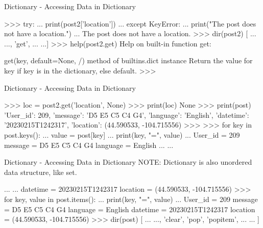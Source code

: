 \documentclass{beamer}
\begin{document}
\begin{frame}[fragile]{Dictionary - Accessing Data in Dictionary}
\begin{pythoncode}
>>> try:
...     print(post2['location'])
... except KeyError:
...     print("The post does not have a location.")
...
The post does not have a location.
>>> dir(post2)
[ ... ..., 'get', ... ...]
>>> help(post2.get)
Help on built-in function get:

get(key, default=None, /) method of builtins.dict instance
    Return the value for key if key is in the dictionary, else default.
>>> 
\end{pythoncode}
\end{frame}

\begin{frame}[fragile]{Dictionary - Accessing Data in Dictionary}
\begin{pythoncode}
>>> loc = post2.get('location', None)
>>> print(loc)
None
>>> print(post)
{'User_id': 209, 'message': 'D5 E5 C5 C4 G4', 'language': 'English', 
 'datetime': '20230215T1242317', 'location': (44.590533, -104.715556)}
>>>
>>> for key in post.keys():
...     value = post[key]
...     print(key, "=", value)
...
User_id = 209
message = D5 E5 C5 C4 G4
language = English
... ...
\end{pythoncode}
\end{frame}

\begin{frame}[fragile]{Dictionary - Accessing Data in Dictionary}
NOTE: Dictionary is also unordered data structure, like set.
\begin{pythoncode}
... ...
datetime = 20230215T1242317
location = (44.590533, -104.715556)
>>> for key, value in post.items():
...     print(key, "=", value)
...
User_id = 209
message = D5 E5 C5 C4 G4
language = English
datetime = 20230215T1242317
location = (44.590533, -104.715556)
>>> dir(post)
[ ... ..., 'clear', 'pop', 'popitem', ... ... ]
\end{pythoncode}
\end{frame}
\end{document}

